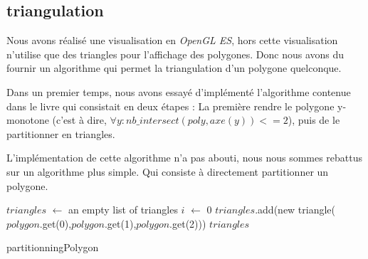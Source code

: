 \subsection{triangulation}
Nous avons réalisé une visualisation en \emph{OpenGL ES}, hors cette visualisation n'utilise que des triangles pour l'affichage des polygones. Donc nous avons du fournir un algorithme qui permet la triangulation d'un polygone quelconque.

Dans un premier temps, nous avons essayé d'implémenté l'algorithme contenue dans le livre \cite[p.~45]{compute} qui consistait en deux étapes : La première rendre le polygone y-monotone (c'est à dire, $\forall y : nb\_intersect(poly,axe(y))<=2$), puis de le partitionner en triangles.

L'implémentation de cette algorithme n'a pas abouti, nous nous sommes rebattus sur un algorithme plus simple. Qui consiste à directement partitionner un polygone.\\

\begin{algorithm}[H]
$triangles$ $\gets$ an empty list of triangles\;
$i$ $\gets$ 0\;
$triangles$.add(new triangle($polygon$.get(0),$polygon$.get(1),$polygon$.get(2)))\;
\Return $triangles$\;
\caption{partitionningPolygon\label{triangulation}}
\end{algorithm}